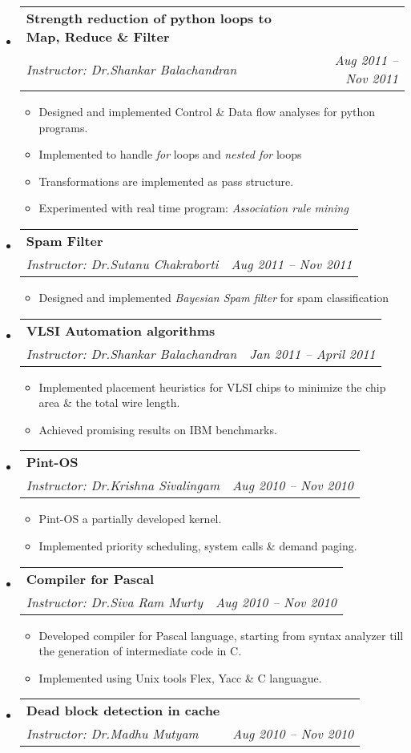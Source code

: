 \documentclass[letterpaper,11pt]{article}
\makeatletter
\newcommand{\resitem}[1]{\item #1 \vspace{-2pt}}
\newcommand{\ressubheading}[4]{
\begin{tabular*}{6.5in}{l@{\extracolsep{\fill}}r}
		\textbf{#1} & #2 \\
		\textit{#3} & \textit{#4} \\
\end{tabular*}\vspace{-6pt}}
\makeatother
\begin{document}
	\begin{itemize}
		\item
			\ressubheading{{Strength reduction of python loops to Map, Reduce \& Filter}}{}{Instructor: Dr.Shankar Balachandran}{Aug 2011 -- Nov 2011}
				{ \footnotesize
				\begin{itemize}
					\resitem{Designed and implemented Control \& Data flow analyses for python programs.}
					\resitem{Implemented to handle \emph{for} loops and \emph{nested for} loops}
					\resitem{Transformations are implemented as pass structure.}
					\resitem{Experimented with real time program: \emph{Association rule mining}}
				\end{itemize}
				}
		\item
			\ressubheading{{Spam Filter}}{}{Instructor: Dr.Sutanu Chakraborti}{Aug 2011 -- Nov 2011}
			{\footnotesize
			\begin{itemize}
				\resitem{Designed and implemented \emph{Bayesian Spam filter} for spam classification}
			\end{itemize}
			}
		\item
			\ressubheading{{VLSI Automation algorithms}}{}{Instructor: Dr.Shankar Balachandran}{Jan 2011 -- April 2011}
			{ \footnotesize
			\begin{itemize}
				\resitem{Implemented placement heuristics for VLSI chips to minimize the chip area \& the total wire length.}
			    \resitem{Achieved promising results on IBM benchmarks.}
			\end{itemize}
			}
		\item
			\ressubheading{{Pint-OS}}{}{Instructor: Dr.Krishna Sivalingam} {Aug 2010 -- Nov 2010}
				{ \footnotesize
				\begin{itemize}
					\resitem{Pint-OS a partially developed kernel.}
					\resitem{Implemented priority scheduling, system calls \& demand paging.}
				\end{itemize}
				}
		\item
			\ressubheading{{Compiler for Pascal}}{}{Instructor: Dr.Siva Ram Murty} {Aug 2010 -- Nov 2010}
				{ \footnotesize
				\begin{itemize}
					\resitem{Developed compiler for Pascal language, starting from syntax analyzer till the generation of intermediate code in C.}
					\resitem{Implemented using Unix tools Flex, Yacc \& C languague.}
				\end{itemize}
				}
		\item
			\ressubheading{{Dead block detection in cache}}{}{Instructor: Dr.Madhu Mutyam}{Aug 2010 -- Nov 2010}

\end{itemize}
\end{document}
